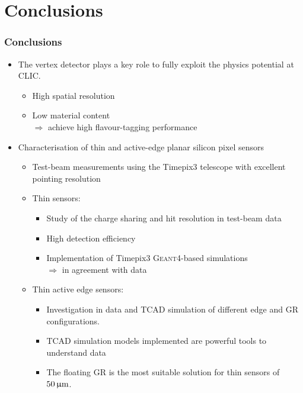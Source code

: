 \section{Conclusions}
\begin{frame}
  \frametitle{}
  \tableofcontents[currentsection]
\end{frame}
\label{lastslide}
\begin{frame}
  \frametitle{Conclusions}

  \begin{itemize}
  \item The vertex detector plays a key role to fully exploit the
    physics potential at CLIC.
    \begin{itemize}
    \item High spatial resolution
    \item Low material content
     \\
     $\Rightarrow$ achieve high flavour-tagging performance
    \end{itemize} 
  \item Characterisation of thin and active-edge planar silicon pixel
    sensors
      \begin{itemize}
      \item Test-beam measurements using the Timepix3 telescope with
        excellent pointing resolution
      \item Thin sensors:
        \begin{itemize}
        \item Study of the charge sharing and hit resolution in
          test-beam data
        \item High detection efficiency
        \item Implementation of Timepix3 \textsc{Geant4}-based
          simulations 
         \\ $\Rightarrow$ in agreement with data
        \end{itemize}

      \item Thin active edge sensors:
        \begin{itemize}
        \item Investigation in data and TCAD simulation of different
          edge and GR configurations.
        \item TCAD simulation models implemented are powerful tools to
          understand data
        \item The floating GR is the most suitable solution for thin
          sensors of $50\,\upmu\mathrm{m}$.
        \end{itemize}
      \end{itemize}

  \end{itemize}

\end{frame}

